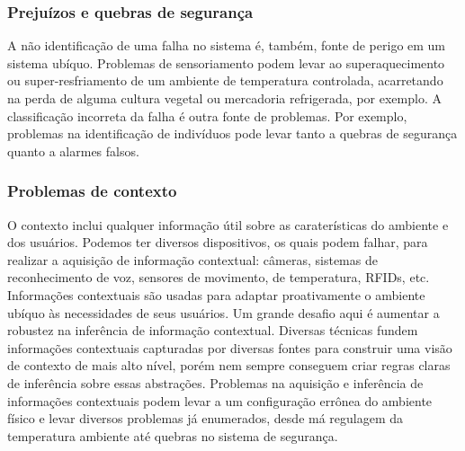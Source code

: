 \subsubsection*{Prejuízos e quebras de segurança}

A não identificação de uma falha no sistema é, também, fonte de perigo em um sistema ubíquo. Problemas de sensoriamento podem levar ao superaquecimento ou super-resfriamento de um ambiente de temperatura controlada, acarretando na perda de alguma cultura vegetal ou mercadoria refrigerada, por exemplo. A classificação incorreta da falha é outra fonte de problemas. Por exemplo, problemas na identificação de indivíduos pode levar tanto a quebras de segurança quanto a alarmes falsos.

\subsubsection*{Problemas de contexto}

O contexto inclui qualquer informação útil sobre as caraterísticas do ambiente e dos usuários. Podemos ter diversos dispositivos, os quais  podem falhar, para realizar a aquisição de informação contextual: câmeras, sistemas de reconhecimento de voz, sensores de movimento, de temperatura, RFIDs, etc. Informações contextuais são usadas para adaptar proativamente o ambiente ubíquo às necessidades de seus usuários. Um grande desafio aqui é aumentar a robustez na inferência de informação contextual. Diversas técnicas fundem informações contextuais capturadas por diversas fontes para construir uma visão de contexto de mais alto nível, porém nem sempre conseguem criar regras claras de inferência sobre essas abstrações. Problemas na aquisição e inferência de informações contextuais podem levar a um configuração errônea do ambiente físico e levar diversos problemas já enumerados, desde má regulagem da temperatura ambiente até quebras no sistema de segurança.




